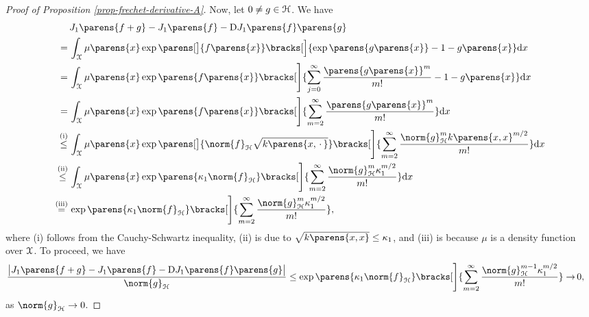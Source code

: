 \begin{proof}[Proof of Proposition \ref{prop-frechet-derivative-A}]
	Now, let $0 \ne g \in \mathcal{H}$. We have 
	\begin{align*}
		  & \, J_1 \parens{f + g} - J_1 \parens{f} - \Diff J_1 \parens{f} \parens{g} \\ 
		=  & \, \int_{\calX} \mu \parens{x} \exp \parens[\big]{ f \parens{x} } \bracks[\Big]{\exp \parens{ g \parens{x} } - 1 - g \parens{x} } \diff x \\ 
		= & \, \int_{\calX} \mu \parens{x} \exp \parens{ f \parens{x} } \bracks[\Bigg]{\sum_{j=0}^\infty \frac{\parens{ g \parens{x} }^m}{m!} - 1 - g \parens{x}} \diff x \\
		= & \, \int_{\calX} \mu \parens{x} \exp \parens{ f \parens{x} } \bracks[\Bigg]{ \sum_{m=2}^\infty \frac{\parens{ g \parens{x} }^m}{m!}} \diff x \\
		\stackrel{\text{(i)}}{\le} & \, \int_{\calX} \mu \parens{x} \exp \parens[\big]{ \norm{f}_{\calH} \sqrt{k \parens{x, \,\cdot\,}} } \bracks[\Bigg]{ \sum_{m=2}^\infty \frac{\norm{g}_{\calH}^m k \parens{x, x}^{m/2}}{m!}} \diff x \\ 
		\stackrel{\text{(ii)}}{\le} & \, \int_{\calX} \mu \parens{x} \exp \parens{ \kappa_1 \norm{f}_{\calH} } \bracks[\Bigg]{ \sum_{m=2}^\infty \frac{\norm{g}_{\calH}^m \kappa_1^{m/2}}{m!}} \diff x \\ 
		\stackrel{\text{(iii)}}{=} & \, \exp \parens{ \kappa_1 \norm{f}_{\calH} } \bracks[\Bigg]{ \sum_{m=2}^\infty \frac{\norm{g}_{\calH}^m \kappa_1^{m/2}}{m!}}, 
	\end{align*}
	where (i) follows from the Cauchy-Schwartz inequality, (ii) is due to $\sqrt{k \parens{x, x}} \le \kappa_1$, and (iii) is because $\mu$ is a density function over $\mathcal{X}$. To proceed, we have 
	\begin{align*}
		\frac{\abs[\big]{J_1 \parens{f + g} - J_1 \parens{f} - \Diff J_1 \parens{f} \parens{g}}}{\norm{g}_{\calH}} 
		\le \exp \parens{ \kappa_1 \norm{f}_{\calH} } \bracks[\Bigg]{ \sum_{m=2}^\infty \frac{\norm{g}_{\calH}^{m-1} \kappa_1^{m/2}}{m!}} 
		\to & \, 0, 
	\end{align*}
	as $\norm{g}_{\calH} \to 0$. 
	

\end{proof}
